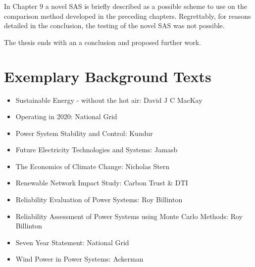 \documentclass[a4paper,oneside,12pt]{report}
\begin{document}
In Chapter 9 a novel SAS is briefly described as a possible scheme to use on the comparison method developed in the preceding chapters. Regrettably, for reasons detailed in the conclusion, the testing of the novel SAS was not possible.

The thesis ends with an a conclusion and proposed further work.

\pagebreak
\section{Exemplary Background Texts}

\begin{itemize}
\item Sustainable Energy - without the hot air: David J C MacKay \cite{MacKay2009}
\item Operating in 2020: National Grid \cite{Grid2009}
\item Power System Stability and Control: Kundur \cite{Kundur1994}
\item Future Electricity Technologies and Systems: Jamasb \cite{Jamasb2006}
\item The Economics of Climate Change: Nicholas Stern \cite{Stern2007}
\item Renewable Network Impact Study: Carbon Trust \& DTI \cite{Trust2005}
\item Reliability Evaluation of Power Systems: Roy Billinton \cite{Billinton1996}
\item Reliability Assessment of Power Systems using Monte Carlo Methods: Roy Billinton \cite{Billinton1994}
\item Seven Year Statement: National Grid \cite{Grid2007}
\item Wind Power in Power Systems: Ackerman \cite{Ackermann2005}
\end{itemize}










\end{document}
